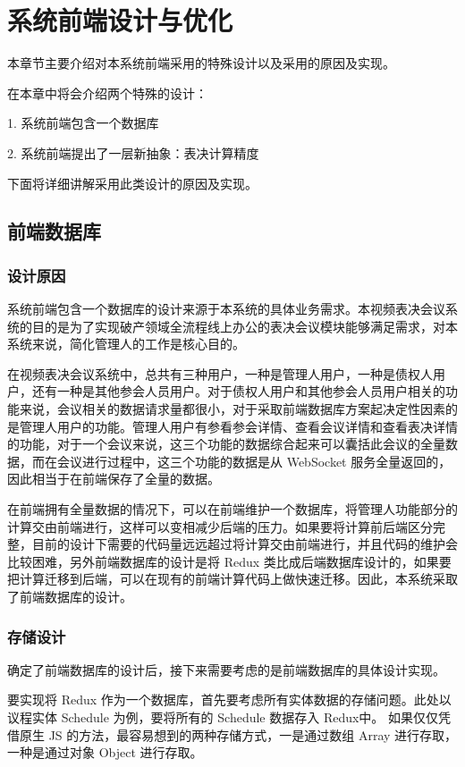 \chapter{系统前端设计与优化}
本章节主要介绍对本系统前端采用的特殊设计以及采用的原因及实现。

在本章中将会介绍两个特殊的设计：

1. 系统前端包含一个数据库

2. 系统前端提出了一层新抽象：表决计算精度

下面将详细讲解采用此类设计的原因及实现。

\section{前端数据库}

\subsection{设计原因}

系统前端包含一个数据库的设计来源于本系统的具体业务需求。本视频表决会议系统的目的是为了实现破产领域全流程线上办公的表决会议模块能够满足需求，对本系统来说，简化管理人的工作是核心目的。

在视频表决会议系统中，总共有三种用户，一种是管理人用户，一种是债权人用户，还有一种是其他参会人员用户。对于债权人用户和其他参会人员用户相关的功能来说，会议相关的数据请求量都很小，对于采取前端数据库方案起决定性因素的是管理人用户的功能。管理人用户有参看参会详情、查看会议详情和查看表决详情的功能，对于一个会议来说，这三个功能的数据综合起来可以囊括此会议的全量数据，而在会议进行过程中，这三个功能的数据是从 WebSocket 服务全量返回的，因此相当于在前端保存了全量的数据。

在前端拥有全量数据的情况下，可以在前端维护一个数据库，将管理人功能部分的计算交由前端进行，这样可以变相减少后端的压力。如果要将计算前后端区分完整，目前的设计下需要的代码量远远超过将计算交由前端进行，并且代码的维护会比较困难，另外前端数据库的设计是将 Redux 类比成后端数据库设计的，如果要把计算迁移到后端，可以在现有的前端计算代码上做快速迁移。因此，本系统采取了前端数据库的设计。

\subsection{存储设计}

确定了前端数据库的设计后，接下来需要考虑的是前端数据库的具体设计实现。

要实现将 Redux 作为一个数据库，首先要考虑所有实体数据的存储问题。此处以议程实体 Schedule 为例，要将所有的 Schedule 数据存入 Redux中。 如果仅仅凭借原生 JS 的方法，最容易想到的两种存储方式，一是通过数组 Array 进行存取，一种是通过对象 Object 进行存取。

